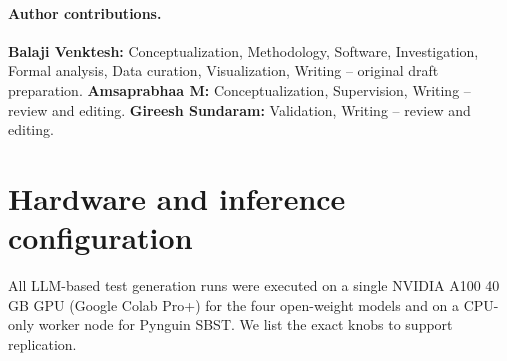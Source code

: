 \documentclass[smallextended]{svjour3}
\begin{document}
\paragraph{Author contributions.}
\textbf{Balaji Venktesh:} Conceptualization, Methodology, Software,
Investigation, Formal analysis, Data curation, Visualization,
Writing -- original draft preparation.
\textbf{Amsaprabhaa M:} Conceptualization, Supervision,
Writing -- review and editing.
\textbf{Gireesh Sundaram:} Validation, Writing -- review and editing.




\appendix

\section{Hardware and inference configuration}\label{app:hardware}

All LLM-based test generation runs were executed on a single
NVIDIA A100 40\,GB GPU (Google Colab Pro+) for the four
open-weight models and on a CPU-only worker node for Pynguin
SBST. We list the exact knobs to support replication.
\end{document}
